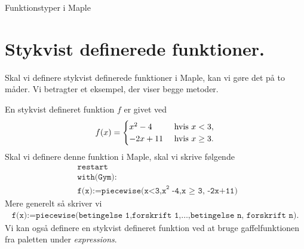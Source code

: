 

\begin{center}
\Huge
Funktionstyper i Maple
\end{center}

\section*{Stykvist definerede funktioner.}

Skal vi definere stykvist definerede funktioner i Maple, kan vi gøre det på to måder. Vi betragter et eksempel, der viser begge metoder.
\begin{exa}
	En stykvist defineret funktion $f$ er givet ved
	\begin{align*}
		f(x) = 
		\begin{cases}
			x^2 - 4 \ &\textnormal{hvis }x < 3,\\
			-2x + 11 \ &\textnormal{hvis }x \geq 3.
		\end{cases}
	\end{align*}
	Skal vi definere denne funktion i Maple, skal vi skrive følgende
	\begin{align*}
		&\texttt{restart}\\
		&\texttt{with(Gym):}\\
		&\texttt{f(x):=piecewise(x<3,x}^\texttt{2}\texttt{-4,x $\geq$ 3, -2x+11)}
	\end{align*}
	Mere generelt så skriver vi
	\begin{align*}
		\texttt{f(x):=piecewise(betingelse 1,forskrift 1,$\hdots$,betingelse n, forskrift n)}.
	\end{align*}
	Vi kan også definere en stykvist defineret funktion ved at bruge gaffelfunktionen fra paletten under \textit{expressions}.


\end{exa}

